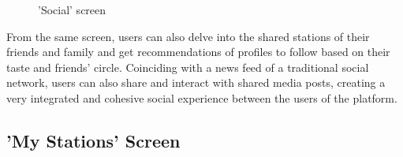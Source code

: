 \begin{figure}[htbp]
	\centering
	 \qquad
	 \qquad
	\caption{'Social' screen}
	\label{fig:mfp1}
\end{figure}

From the same screen, users can also delve into the shared stations of their friends and family and get recommendations of profiles to follow based on their taste and friends' circle. Coinciding with a news feed of a traditional social network, users can also share and interact with shared media posts, creating a very integrated and cohesive social experience between the users of the platform.

\newpage
\subsection{'My Stations' Screen}

